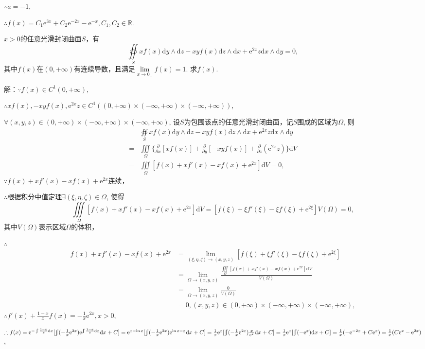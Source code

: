 \documentclass[12pt,UTF8]{ctexart}
\newcommand{\IIInt}[3]{\iiint\limits_{#1}#2\mathrm d#3}
\newcommand{\md}[1]{\mathrm d#1}
\newcommand{\varppx}[1]{\frac{\partial}{\partial x} #1}
\newcommand{\varppy}[1]{\frac{\partial}{\partial y} #1}
\newcommand{\varppz}[1]{\frac{\partial}{\partial z} #1}
\newcommand{\BSOIInt}[2]{\oiint\limits_{#1}#2}
\newcommand{\me}[0]{\mathrm e}
\begin{document}
\begin{enumerate}
$\therefore a=-1$,

$\therefore f(x)=C_1\me^{3x}+C_2\me^{-2x}-\me^{-x},C_1,C_2\in\mathbb R$.

$x>0$的任意光滑封闭曲面$S$，有
\[\BSOIInt S{xf(x)\md y\wedge\md z-xyf(x)\md z\wedge\md x+\me^{2x}z\md x\wedge\md y}=0,\]
其中$f(x)$在$(0,+\infty)$有连续导数，且满足$\lim\limits_{x\rightarrow0_+}f(x)=1$. 求$f(x)$.

解：$\because f(x)\in C^1(0,+\infty)$,

$\therefore xf(x),-xyf(x),\me^{2x}z\in C^1((0,+\infty)\times(-\infty,+\infty)\times(-\infty,+\infty))$,

$\forall(x,y,z)\in(0,+\infty)\times(-\infty,+\infty)\times(-\infty,+\infty)$, 设$S$为包围该点的任意光滑封闭曲面，记$S$围成的区域为$\Omega$, 则
\[\begin{aligned}
&\BSOIInt S{xf(x)\md y\wedge\md z-xyf(x)\md z\wedge\md x+\me^{2x}z\md x\wedge\md y}\\
=&\IIInt\Omega{\{\varppx{[xf(x)]}+\varppy{[-xyf(x)]}+\varppz{(\me^{2x}z)}\}}V\\
=&\IIInt\Omega{[f(x)+xf'(x)-xf(x)+\me^{2x}]}V=0,
\end{aligned}\]
$\because f(x)+xf'(x)-xf(x)+\me^{2x}$连续，

$\therefore$根据积分中值定理$\exists(\xi,\eta,\zeta)\in\Omega$, 使得\[\IIInt\Omega{[f(x)+xf'(x)-xf(x)+\me^{2x}]}V=[f(\xi)+\xi f'(\xi)-\xi f(\xi)+\me^{2\xi}]V(\Omega)=0,\]
其中$V(\Omega)$表示区域$\Omega$的体积，

$\therefore$
\[\begin{aligned}
f(x)+xf'(x)-xf(x)+\me^{2x}&=\lim\limits_{(\xi,\eta,\zeta)\rightarrow(x,y,z)}[f(\xi)+\xi f'(\xi)-\xi f(\xi)+\me^{2\xi}]\\
&=\lim\limits_{\Omega\rightarrow(x,y,z)}\frac{\IIInt\Omega{[f(x)+xf'(x)-xf(x)+\me^{2x}]}V}{V(\Omega)}\\
&=\lim\limits_{\Omega\rightarrow(x,y,z)}\frac0{V(\Omega)}\\
&=0,(x,y,z)\in(0,+\infty)\times(-\infty,+\infty)\times(-\infty,+\infty),
\end{aligned}\]
$\therefore f'(x)+\frac{1-x}xf(x)=-\frac1x\me^{2x},x>0$,

$\therefore f(x)=\me^{-\varint\frac{1-x}x\md x}[\varint(-\frac1x\me^{2x})\me^{\varint\frac{1-x}x\md x}\md x+C]=\me^{x-\ln x}[\varint(-\frac1x\me^{2x})\me^{\ln x-x}\md x+C]\\
=\frac1x\me^x[\varint(-\frac1x\me^{2x})\frac x{\me^x}\md x+C]=\frac1x\me^x[\varint(-\me^x)\md x+C]=\frac1x(-\me^{-2x}+C\me^x)=\frac1x(C\me^x-\me^{2x})$,


\end{enumerate}
\end{document}
